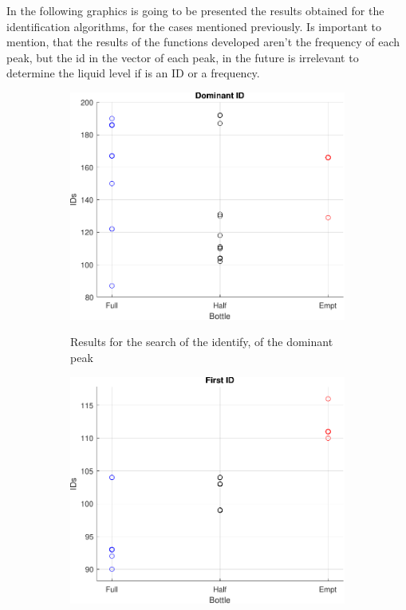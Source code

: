 In the following graphics is going to be presented the results obtained for the identification algorithms, for the cases mentioned previously. Is important to mention, that the results of the functions developed aren't the frequency of each peak, but the id in the vector of each peak, in the future is irrelevant to determine the liquid level if is an ID or a frequency.
\begin{figure}[]
    \centering
    \begin{subfigure}{0.45\textwidth}
        \centering
        \includegraphics[width=\linewidth]{Chapters/6CHP/Figures/ResultsuCGraphs/MIC/BotMiddomID.pdf}
        \caption{Results for the search of the identify, of the dominant peak}{}
        \label{subfig:domIDMIC}
    \end{subfigure}
    \begin{subfigure}{0.45\textwidth}
        \centering
        \includegraphics[width=\linewidth]{Chapters/6CHP/Figures/ResultsuCGraphs/MIC/BotMidfID.pdf}

\end{subfigure}
\end{figure}
